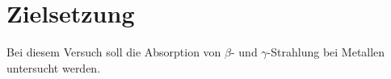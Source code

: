 \section{Zielsetzung}
\label{sec:Zielsetzung}
Bei diesem Versuch soll die Absorption von $\beta$- und $\gamma$-Strahlung bei Metallen untersucht werden. 
